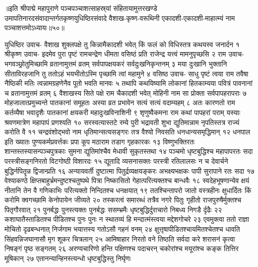 ॥इति श्रीपाद्मे महापुराणे पञ्चपञ्चाशत्साहस्र्यां संहितायामुत्तरखण्डे उमापतिनारदसंवादान्तर्गतकृष्णयुधिष्ठिरसंवादे वैशाख-कृष्ण-वरूथिनी एकादशी-एकादशी-माहात्म्यं नाम पञ्चाशत्तमोऽध्यायः॥५०॥



युधिष्ठिर उवाच-
वैशाख शुक्लपक्षे तु किन्नामैकादशी भवेत् 
किं फलं को विधिस्तत्र कथयस्व जनार्दन १
श्रीकृष्ण उवाच-
इदमेव पुरा पृष्टं रामचन्द्रेण धीमता 
वसिष्ठं प्रति राजेन्द्र यत्त्वं मामनुपृच्छसि २
राम उवाच-
भगवञ्छ्रोतुमिच्छामि व्रतानामुत्तमं व्रतम् 
सर्वपापक्षयकरं सर्वदुःखनिकृन्तनम् ३
मया दुःखानि भुक्तानि सीताविरहजानि तु 
ततोऽहं भयभीतोऽस्मि पृच्छामि त्वां महामुने ४
वसिष्ठ उवाच-
साधु पृष्टं त्वया राम तवैषा नैष्ठिकी मतिः 
त्वन्नामग्रहणेनैव पूतो भवति मानवः ५
तथापि कथयिष्यामि लोकानां हितकाम्यया 
पवित्रं पावनानां च व्रतानामुत्तमं व्रतम् ६
वैशाखस्य सिते पक्षे राम चैकादशी भवेत् 
मोहिनी नाम सा प्रोक्ता सर्वपापहरापराः ७
मोहजालात्प्रमुच्यन्ते पातकानां समूहतः 
अस्या व्रत प्रभावेन सत्यं सत्यं वदाम्यहम् ८
अतः कारणतो राम कर्तव्यैषा भवादृशैः 
पातकानां क्षयकरी महादुःखविनाशिनी ९
शृणुष्वैकमना राम कथां पापहरां पराम् 
यस्याः श्रवणमात्रेण महापापं प्रणश्यति १०
सरस्वत्यास्तटे रम्ये पुरी भद्रावती शुभा 
द्युतिमान्नाम नृपतिस्तत्र राज्यं करोति वै ११
चन्द्रवंशोद्भवो नाम धृतिमान्सत्यसङ्गरः 
तत्र वैश्यो निवसति धनधान्यसमृद्धिमान् १२
धनपाल इति ख्यातः पुण्यकर्मप्रवर्त्तकः 
प्रपा कूप मठाराम तडाग गृहकारकः १३
विष्णुभक्तिरतः शान्तस्तस्यासन्पञ्चपुत्रकाः 
सुमना द्युतिमांश्चैव मेधावी सुकृतस्तथा १४
पञ्चमो धृष्टबुद्धिश्च महापापरतः सदा 
परस्त्रीसङ्गनिरतो विटगोष्ठी विशारदः १५
द्यूतादि व्यसनासक्तः परस्त्री रतिलालसः 
न च देवार्चने बुद्धिर्नपितॄन्न द्विजान्प्रति १६
अन्यायवर्ती दुष्टात्मा पितुर्द्रव्यक्षयङ्करः 
अभक्ष्यभक्षकः पापी सुरापाने रतः सदा १७
वेश्याकण्ठे क्षिप्तबाहुर्भ्रमन्दुष्टश्चतुष्पथे 
पित्रा निष्कासितो गेहात्परित्यक्तश्च बान्धवैः १८
स्वदेहभूषणान्येव क्षयं नीतानि तेन वै 
गणिकाभिः परित्यक्तो निन्दितश्च धनक्षयात् १९
ततश्चिन्तापरो जातो वस्त्रहीनः क्षुधार्दितः 
किं करोमि क्वगच्छामि केनोपायेन जीव्यते २०
तस्करत्वं समारब्धं तत्रैव नगरे पितुः 
गृहीतो राजपुरुषैर्मुक्तश्च पितृगौरवात् २१
पुनर्बद्धः पुनस्त्यक्तः पुनर्बद्धः ससम्भ्रमैः 
धृष्टबुद्धिर्दुराचारो निबध्य निगडै र्दृढैः २२
कशाघातैस्ताडितश्च पीडितश्च पुनः पुनः 
न स्थातव्यं हि मन्दात्मंस्त्वया मद्देशगोचरे २३
एवमुक्त्वा ततो राज्ञा मोचितो दृढबन्धनात् 
निर्जगाम भयात्तस्य गतोऽसौ गहनं वनम् २४
क्षुत्तृषापीडितश्चायमितश्चेतश्च धावति 
सिंहवन्निजघानासौ मृग शूकर चित्रलान् २५
आमिषाहार निरतो वने तिष्ठति सर्वदा 
करे शरासनं कृत्वा निषङ्गं पृष्ठ सङ्गतम् २६
अरण्यचारिणो हन्ति पक्षिणश्च पदाचरन् 
चकोरांश्च मयूरांश्च कङ्क तित्तिर मूषिकान् २७
एतानन्यान्हिनस्त्यन्धो धृष्टबुद्धिस्तु निर्घृणः 
